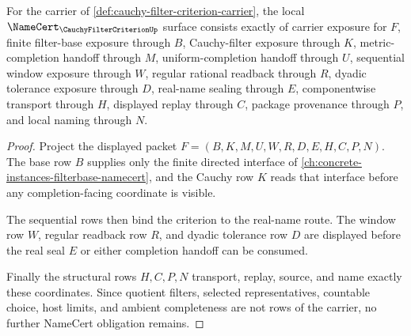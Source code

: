\begin{theorem}
\label{thm:cauchy-filter-criterion-namecert-obligations}
For the carrier of \autoref{def:cauchy-filter-criterion-carrier}, the local $\NameCert_{\CauchyFilterCriterionUp}$ surface consists exactly of carrier exposure for $F$, finite filter-base exposure through $B$, Cauchy-filter exposure through $K$, metric-completion handoff through $M$, uniform-completion handoff through $U$, sequential window exposure through $W$, regular rational readback through $R$, dyadic tolerance exposure through $D$, real-name sealing through $E$, componentwise transport through $H$, displayed replay through $C$, package provenance through $P$, and local naming through $N$.
\end{theorem}
\begin{proof}
Project the displayed packet $F=(B,K,M,U,W,R,D,E,H,C,P,N)$. The base row $B$ supplies only the finite directed interface of \autoref{ch:concrete-instances-filterbase-namecert}, and the Cauchy row $K$ reads that interface before any completion-facing coordinate is visible.

The sequential rows then bind the criterion to the real-name route. The window row $W$, regular readback row $R$, and dyadic tolerance row $D$ are displayed before the real seal $E$ or either completion handoff can be consumed.

Finally the structural rows $H,C,P,N$ transport, replay, source, and name exactly these coordinates. Since quotient filters, selected representatives, countable choice, host limits, and ambient completeness are not rows of the carrier, no further NameCert obligation remains.
\end{proof}

